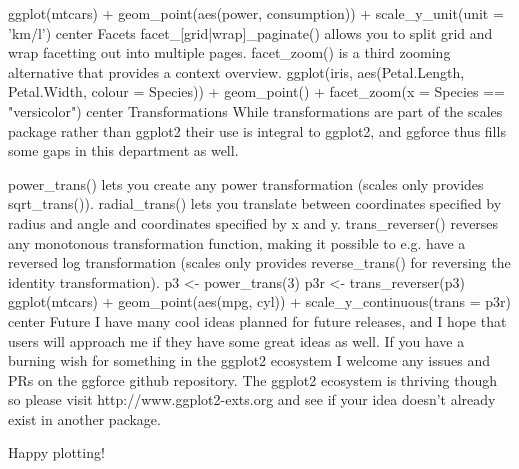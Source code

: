 ggplot(mtcars) +
    geom_point(aes(power, consumption)) +
    scale_y_unit(unit = 'km/l')
center
Facets
facet_[grid|wrap]_paginate() allows you to split grid and wrap facetting out
into multiple pages.
facet_zoom() is a third zooming alternative that provides a context
overview.
ggplot(iris, aes(Petal.Length, Petal.Width, colour = Species)) +
    geom_point() +
    facet_zoom(x = Species == "versicolor")
center
Transformations
While transformations are part of the scales package rather than ggplot2
their use is integral to ggplot2, and ggforce thus fills some gaps in this
department as well.

power_trans() lets you create any power transformation (scales only
provides sqrt_trans()).
radial_trans() lets you translate between coordinates specified by radius
and angle and coordinates specified by x and y.
trans_reverser() reverses any monotonous transformation function, making it
possible to e.g. have a reversed log transformation (scales only provides
reverse_trans() for reversing the identity transformation).
p3 <- power_trans(3)
p3r <- trans_reverser(p3)
ggplot(mtcars) + 
    geom_point(aes(mpg, cyl)) + 
    scale_y_continuous(trans = p3r)
center
Future
I have many cool ideas planned for future releases, and I hope that users will
approach me if they have some great ideas as well. If you have a burning wish
for something in the ggplot2 ecosystem I welcome any issues and PRs on the
ggforce github repository. The
ggplot2 ecosystem is thriving though so please visit
http://www.ggplot2-exts.org and see if your idea doesn’t already exist in
another package.

Happy plotting!
